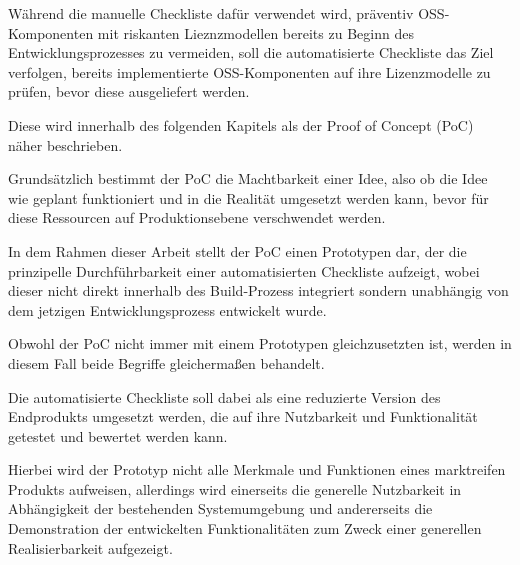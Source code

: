 
Während die manuelle Checkliste dafür verwendet wird, präventiv OSS-Komponenten mit riskanten Lieznzmodellen bereits zu Beginn des Entwicklungsprozesses zu vermeiden, soll die automatisierte Checkliste das Ziel verfolgen, bereits implementierte OSS-Komponenten auf ihre Lizenzmodelle zu prüfen, bevor diese ausgeliefert werden.

Diese wird innerhalb des folgenden Kapitels als der Proof of Concept (PoC) näher beschrieben.

Grundsätzlich bestimmt der PoC die Machtbarkeit einer Idee, also ob die Idee wie geplant funktioniert und in die Realität umgesetzt werden kann, bevor für diese Ressourcen auf Produktionsebene verschwendet werden.  

In dem Rahmen dieser Arbeit stellt der PoC einen Prototypen dar, der die prinzipelle Durchführbarkeit einer automatisierten Checkliste aufzeigt, wobei dieser nicht direkt innerhalb des Build-Prozess integriert sondern unabhängig von dem jetzigen Entwicklungsprozess entwickelt wurde.  

Obwohl der PoC nicht immer mit einem Prototypen gleichzusetzten ist, werden in diesem Fall beide Begriffe gleichermaßen behandelt.

Die automatisierte Checkliste soll dabei als eine reduzierte Version des Endprodukts umgesetzt werden, die auf ihre Nutzbarkeit und Funktionalität getestet und bewertet werden kann. 

Hierbei wird der Prototyp nicht alle Merkmale und Funktionen eines marktreifen Produkts aufweisen, allerdings wird einerseits die generelle Nutzbarkeit in Abhängigkeit der bestehenden Systemumgebung und andererseits die Demonstration der entwickelten Funktionalitäten zum Zweck einer generellen Realisierbarkeit aufgezeigt.

